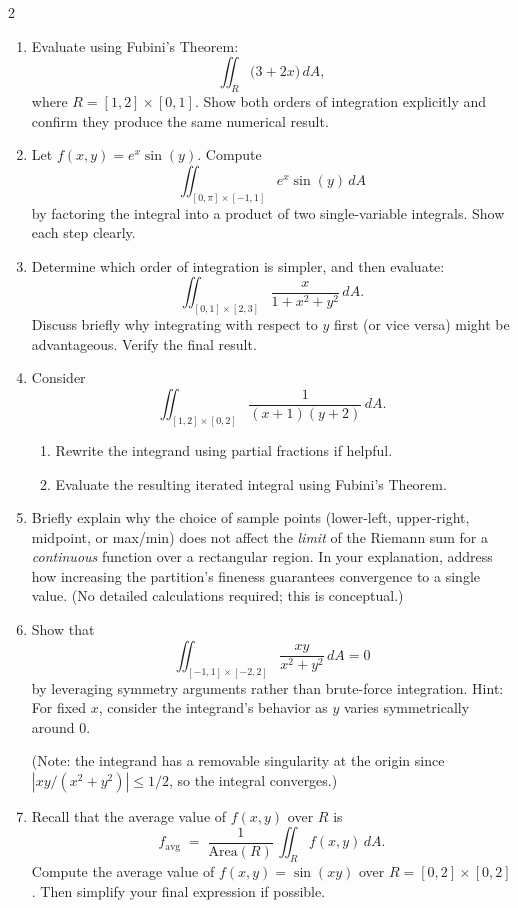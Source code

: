 \begin{multicols}{2}
\begin{enumerate}
\item
Evaluate using Fubini’s Theorem:
\[
\iint_{R} \bigl(3 + 2x\bigr)\, dA,
\]
where \(R = [1,2]\times[0,1]\). Show both orders of integration explicitly and confirm they produce the same numerical result.

\item
Let \(f(x,y)= e^x \sin(y)\). Compute
\[
\iint_{[0,\pi]\times[-1,1]} e^x \sin(y)\,dA
\]
by factoring the integral into a product of two single-variable integrals. Show each step clearly.

\item 
Determine which order of integration is simpler, and then evaluate:
\[
\iint_{[0,1]\times[2,3]} \frac{x}{1 + x^2 + y^2} \, dA.
\]
Discuss briefly why integrating with respect to \(y\) first (or vice versa) might be advantageous. Verify the final result.

\item 
Consider
\[
\iint_{[1,2]\times[0,2]} \frac{1}{(x+1)(y+2)} \,dA.
\]
\begin{enumerate}
   \item Rewrite the integrand using partial fractions if helpful.
   \item Evaluate the resulting iterated integral using Fubini’s Theorem.
\end{enumerate}

\item 
Briefly explain why the choice of sample points (lower-left, upper-right, midpoint, or max/min) does not affect the \emph{limit} of the Riemann sum for a \emph{continuous} function over a rectangular region. In your explanation, address how increasing the partition’s fineness guarantees convergence to a single value. (No detailed calculations required; this is conceptual.)

\item 
Show that
\[
\iint_{[-1,1]\times[-2,2]} \frac{xy}{x^2 + y^2}\,dA = 0
\]
by leveraging symmetry arguments rather than brute-force integration. Hint: For fixed \(x\), consider the integrand’s behavior as \(y\) varies symmetrically around \(0\).

(Note: the integrand has a removable singularity at the origin since \( |xy/(x^2+y^2)| \leq 1/2 \), so the integral converges.)

\item 
Recall that the average value of \(f(x,y)\) over \(R\) is  
\[
f_{\text{avg}} \;=\; \frac{1}{\text{Area}(R)} \,\iint_R f(x,y)\,dA.
\]
Compute the average value of \(f(x,y) = \sin(xy)\) over \(R = [0,2]\times[0,2]\). Then simplify your final expression if possible.


\end{enumerate}
\end{multicols}
